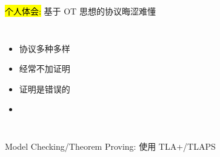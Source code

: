 
\begin{frame}{}
  \centerline{\large \hl{个人体会:} 基于 OT 思想的协议晦涩难懂}

  \vspace{0.60cm}
  \begin{columns}
      \pause
      \begin{itemize}
	\setlength{\itemsep}{10pt}
	\centering
	\item 协议多种多样
	\item 经常不加证明
	\item 证明是错误的
	\item<3-> \hl{}
      \end{itemize}
  \end{columns}
\end{frame}

\begin{frame}{}
  \begin{center}
    {\large 
      Model Checking/Theorem Proving: 使用 TLA+/TLAPS \\[5pt]
      \href{https://github.com/Disalg-ICS-NJU/tlaplus-lamport-projects/tree/master/tlaplus-projects/Hengfeng-Wei/Wei-jupiter-tla}{}
    }
  \end{center}

  \begin{columns}
      \vspace{-0.50cm}
    \pause
  \end{columns}
\end{frame}

